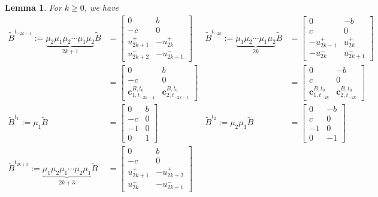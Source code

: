 \documentclass{amsart}
\newtheorem{lemma}[theorem]{Lemma}
\numberwithin{theorem}{section}
\newcommand{\bfc}{\boldsymbol{c}}
\begin{document}
  \begin{lemma}
    \label{lem:rank 2 exchange matrices}
    For $k\ge0$, we have
    \begin{align*}
      \tilde B^{t_{-2k-1}}:=\underbrace{\mu_2\mu_1\mu_2\cdots\mu_1\mu_2}_{2k+1}\tilde B 
      &= 
      \left[\begin{array}{cc} 0 & b \\ -c & 0\\ u^+_{2k+1} & -u^+_{2k}\\ u^-_{2k+2} & -u^-_{2k+1}\end{array}\right]
      &
      \tilde B^{t_{-2k}}:=\underbrace{\mu_1\mu_2\cdots\mu_1\mu_2}_{2k}\tilde B 
      &= 
      \left[\begin{array}{cc} 0 & -b \\ c & 0\\ -u^+_{2k-1} & u^+_{2k}\\ -u^-_{2k} & u^-_{2k+1}\end{array}\right]\\
      &= 
      \left[\begin{array}{cc} 0 & b \\ -c & 0\\ \bfc^{B,t_0}_{1,t_{-2k-1}} & \bfc^{B,t_0}_{2,t_{-2k-1}}\end{array}\right]
      &
      &= 
      \left[\begin{array}{cc} 0 & -b \\ c & 0\\ \bfc^{B,t_0}_{1,t_{-2k}} & \bfc^{B,t_0}_{2,t_{-2k}}\end{array}\right]\\
      \tilde B^{t_1}:=\mu_1\tilde B 
      &= 
      \left[\begin{array}{cc} 0 & b \\ -c & 0\\ -1 & 0\\ 0 & 1\end{array}\right]
      &
      \tilde B^{t_2}:=\mu_2\mu_1\tilde B 
      &= 
      \left[\begin{array}{cc} 0 & -b \\ c & 0\\ -1 & 0\\ 0 & -1\end{array}\right]\\
      \tilde B^{t_{2k+3}}:=\underbrace{\mu_1\mu_2\mu_1\cdots\mu_2\mu_1}_{2k+3}\tilde B 
      &= 
      \left[\begin{array}{cc} 0 & b \\ -c & 0\\ u^+_{2k+1} & -u^+_{2k+2}\\ u^-_{2k} & -u^-_{2k+1}\end{array}\right]

\end{align*}
\end{lemma}
\end{document}
